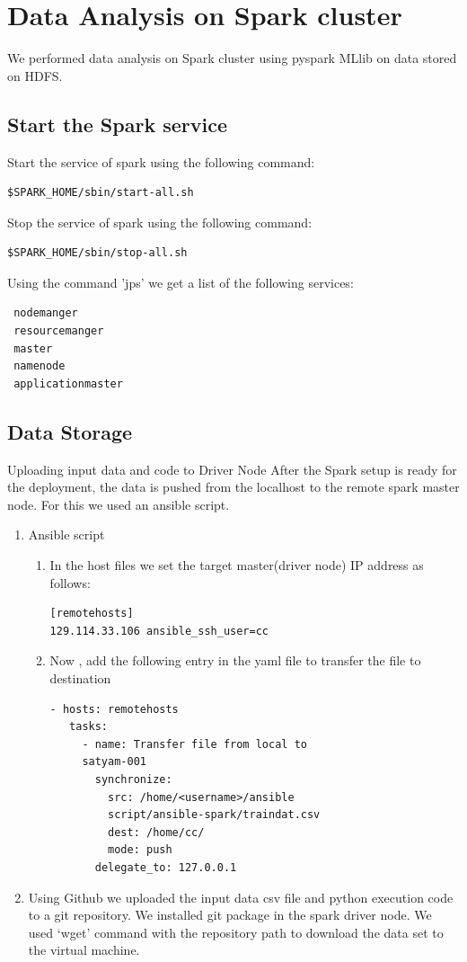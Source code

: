 \documentclass[9pt,twocolumn,twoside]{../../styles/osajnl}
\begin{document}
\section{Data Analysis on Spark cluster}
We performed data analysis on Spark cluster using pyspark MLlib on data stored on HDFS.

\subsection{Start the Spark service}

Start the service of spark using the following command:
\begin{verbatim}
$SPARK_HOME/sbin/start-all.sh
\end{verbatim}



Stop the service of spark using the following command:
\begin{verbatim}
$SPARK_HOME/sbin/stop-all.sh
\end{verbatim}


Using the command 'jps' we get a list of the following services:
\begin{verbatim}
 nodemanger
 resourcemanger
 master
 namenode
 applicationmaster
\end{verbatim}


\subsection{Data Storage}
 Uploading input data and code to Driver Node After the Spark setup is ready for the deployment, the data is pushed from the localhost to the remote spark master node. For this we used an ansible script.
\begin{enumerate}
 \item Ansible script
\begin{enumerate}
 \item In the host files we set the target master(driver node) IP address as follows:
 \begin{verbatim}
[remotehosts]
129.114.33.106 ansible_ssh_user=cc
\end{verbatim}
\item  Now , add the following entry in the yaml file to transfer the file to destination
\begin{verbatim}
- hosts: remotehosts
   tasks:
     - name: Transfer file from local to
     satyam-001
       synchronize:
         src: /home/<username>/ansible
         script/ansible-spark/traindat.csv
         dest: /home/cc/
         mode: push
       delegate_to: 127.0.0.1
\end{verbatim}
\end{enumerate}
\item Using Github we uploaded the input data csv file and python execution code to a git repository. We installed git package in the spark driver node. We used ‘wget’ command  with the repository path to download  the data set to the virtual machine.
\end{enumerate}
\end{document}
